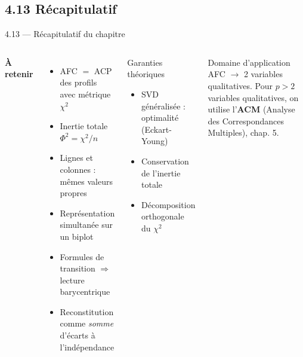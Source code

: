 \subsection{4.13 Récapitulatif}
\begin{frame}{4.13 — Récapitulatif du chapitre}
\begin{columns}[T]
\textbf{À retenir}
\begin{itemize}\small
  \item AFC $=$ ACP des \alert{profils} avec métrique $\chi^2$
  \item Inertie totale $\Phi^2 = \chi^2 / n$
  \item Lignes et colonnes : mêmes valeurs propres
  \item Représentation \alert{simultanée} sur un biplot
  \item Formules de transition $\Rightarrow$ lecture barycentrique
  \item Reconstitution comme \emph{somme} d'écarts à l'indépendance
\end{itemize}

\begin{block}{Garanties théoriques}
\begin{itemize}\small
  \item SVD généralisée : optimalité (Eckart-Young)
  \item Conservation de l'inertie totale
  \item Décomposition orthogonale du $\chi^2$
\end{itemize}
\end{block}

\begin{alertblock}{Domaine d'application}
\small AFC $\to$ \alert{2 variables qualitatives}.
Pour $p > 2$ variables qualitatives, on utilise l'\textbf{ACM}
(Analyse des Correspondances Multiples), chap. 5.
\end{alertblock}
\end{columns}
\end{frame}
